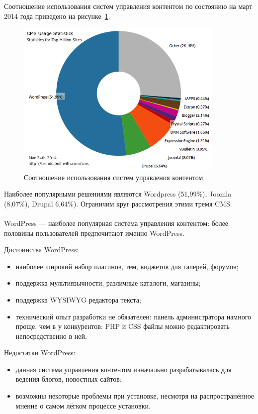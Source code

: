 Соотношение использования систем управления контентом по состоянию на март 2014 года приведено
на рисунке~\ref{fig:cms_usage_stat}.

\begin{figure}[h]
  \centering
  \includegraphics[width=100mm]{pic/cms_usage_statistics.png}
  \caption{Соотношение использования систем управления контентом}
  \label{fig:cms_usage_stat}
\end{figure}

Наиболее популярными решениями являются Wordpress (51{,}99\%), Joomla (8{,}07\%), Drupal 6{,}64\%).
Ограничим круг рассмотрения этими тремя CMS.

\paragraph{}
WordPress --- наиболее популярная система управления контентом:
более половины пользователей предпочитают именно WordPress.

Достоинства WordPress:
\begin{itemize}
\item
  наиболее широкий набор плагинов, тем, виджетов для галерей, форумов;
\item
  поддержка мультиязычности, различные каталоги, магазины;
\item
  поддержка WYSIWYG редактора текста;
\item
  технический опыт разработки не обязателен: панель администратора намного проще, чем в у конкурентов:
  PHP и CSS файлы можно редактировать непосредственно в ней.
\end{itemize}

Недостатки WordPress:
\begin{itemize}
\item
  данная система управления контентом изначально разрабатывалась для ведения блогов, новостных сайтов; 

\item
  возможны некоторые проблемы при установке,
  несмотря на распространённое мнение о самом лёгком процессе установки.
\end{itemize}

